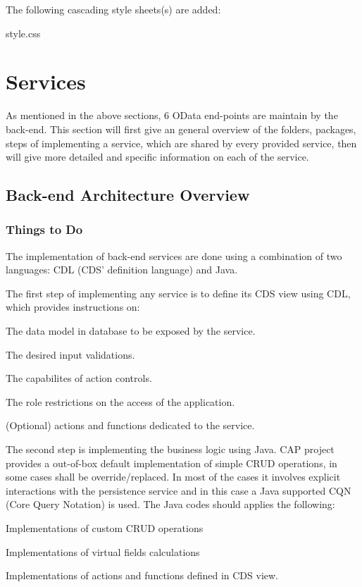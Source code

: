 \bigskip
The following cascading style sheets(s) are added:
\begin{compactenum}
    \item style.css
\end{compactenum}


\section{Services}

As mentioned in the above sections, 6 OData end-points are maintain by the back-end. This section will first give an general overview of the folders, packages, steps of implementing a service, which are shared by every provided service, then will give more detailed and specific information on each of the service.

\subsection{Back-end Architecture Overview}

\subsubsection{Things to Do}

The implementation of back-end services are done using a combination of two languages: CDL (CDS' definition language) and Java.

\bigskip
The first step of implementing any service is to define its CDS view using CDL, which provides instructions on:
\begin{compactenum}
	\item The data model in database to be exposed by the service.
	\item The desired input validations.
	\item The capabilites of action controls.
    \item The role restrictions on the access of the application.
    \item (Optional) actions and functions dedicated to the service.
\end{compactenum}

\bigskip

The second step is implementing the business logic using Java. CAP project provides a out-of-box default implementation of simple CRUD operations, in some cases shall be override/replaced. In most of the cases it involves explicit interactions with the persistence service and in this case a Java supported CQN (Core Query Notation) is used. The Java codes should applies the following:
\begin{compactenum}
	\item Implementations of custom CRUD operations
	\item Implementations of virtual fields calculations
	\item Implementations of actions and functions defined in CDS view.
\end{compactenum}

